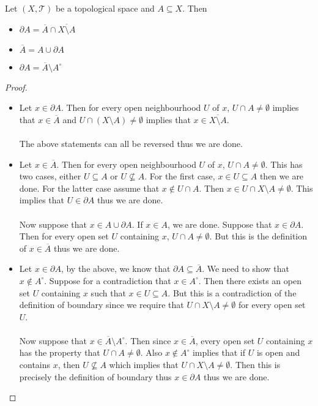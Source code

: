 \begin{prp}{}{} Let $(X,\mathcal{T})$ be a topological space and $A\subseteq X$. Then 
\begin{itemize}
\item $\partial A=\overline{A}\cap\overline{X\setminus A}$
\item $\overline{A}=A\cup\partial A$
\item $\partial A=\overline{A}\setminus A^\circ$
\end{itemize} \tcbline
\begin{proof}~\\
\begin{itemize}
\item Let $x\in\partial A$. Then for every open neighbourhood $U$ of $x$, $U\cap A\neq\emptyset$ implies that $x\in\overline{A}$ and $U\cap(X\setminus A)\neq\emptyset$ implies that $x\in\overline{X\setminus A}$. \\~\\
The above statements can all be reversed thus we are done. 
\item Let $x\in\overline{A}$. Then for every open neighbourhood $U$ of $x$, $U\cap A\neq\emptyset$. This has two cases, either $U\subseteq A$ or $U\not\subseteq A$. For the first case, $x\in U\subseteq A$ then we are done. For the latter case assume that $x\notin U\cap A$. Then $x\in U\cap X\setminus A\neq\emptyset$. This implies that $U\in\partial A$ thus we are done. \\~\\
Now suppose that $x\in A\cup\partial A$. If $x\in A$, we are done. Suppose that $x\in\partial A$. Then for every open set $U$ containing $x$, $U\cap A\neq\emptyset$. But this is the definition of $x\in\overline{A}$ thus we are done. 
\item Let $x\in\partial A$, by the above, we know that $\partial A\subseteq\overline{A}$. We need to show that $x\notin A^\circ$. Suppose for a contradiction that $x\in A^\circ$. Then there exists an open set $U$ containing $x$ such that $x\in U\subseteq A$. But this is a contradiction of the definition of boundary since we require that $U\cap X\setminus A\neq\emptyset$ for every open set $U$. \\~\\
Now suppose that $x\in\overline{A}\setminus A^\circ$. Then since $x\in\overline{A}$, every open set $U$ containing $x$ has the property that $U\cap A\neq\emptyset$. Also $x\notin A^\circ$ implies that if $U$ is open and contains $x$, then $U\not\subseteq A$ which implies that $U\cap X\setminus A\neq\emptyset$. Then this is precisely the definition of boundary thus $x\in\partial A$ thus we are done. 
\end{itemize}
\end{proof}
\end{prp}

